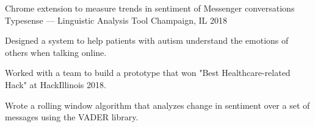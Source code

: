 \begin{cventries}
\cventry
{Chrome extension to measure trends in sentiment of Messenger conversations} %
{Typesense — Linguistic Analysis Tool} %
{Champaign, IL} %
{2018} %
{
	\begin{cvitems} %
		\item {Designed a system to help patients with autism understand the emotions of others when talking online.}
		\item {Worked with a team to build a prototype that won "Best Healthcare-related Hack" at HackIllinois 2018.}
		\item {Wrote a rolling window algorithm that analyzes change in sentiment over a set of messages using the VADER library.}
	\end{cvitems}
}

\end{cventries}

